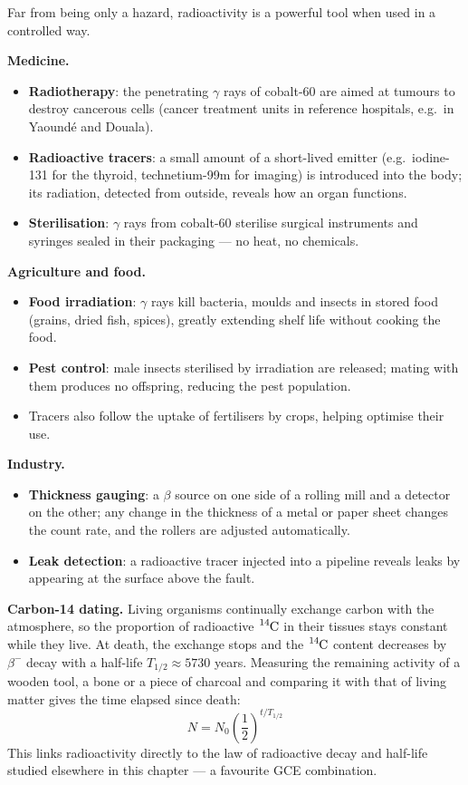 \documentclass[11pt]{article}
\newcounter{popsec}
\newcounter{popsub}
\newcommand{\courssub}[1]{%
  \stepcounter{popsub}%
  \par\vspace{9pt}\noindent{\popxbold\fontsize{11.5}{13}\selectfont\color{popink}{\color{poporange}\thepopsec.\thepopsub}\hspace{6pt}#1}\par\nopagebreak\vspace{4pt}
}
\begin{document}
\courssub{Applications of Radioactivity}

Far from being only a hazard, radioactivity is a powerful tool when used in a controlled way.

\textbf{Medicine.}
\begin{itemize}
\item \textbf{Radiotherapy}: the penetrating $\gamma$ rays of cobalt-60 are aimed at tumours to destroy cancerous cells (cancer treatment units in reference hospitals, e.g.\ in Yaoundé and Douala).
\item \textbf{Radioactive tracers}: a small amount of a short-lived emitter (e.g.\ iodine-131 for the thyroid, technetium-99m for imaging) is introduced into the body; its radiation, detected from outside, reveals how an organ functions.
\item \textbf{Sterilisation}: $\gamma$ rays from cobalt-60 sterilise surgical instruments and syringes sealed in their packaging — no heat, no chemicals.
\end{itemize}

\textbf{Agriculture and food.}
\begin{itemize}
\item \textbf{Food irradiation}: $\gamma$ rays kill bacteria, moulds and insects in stored food (grains, dried fish, spices), greatly extending shelf life without cooking the food.
\item \textbf{Pest control}: male insects sterilised by irradiation are released; mating with them produces no offspring, reducing the pest population.
\item Tracers also follow the uptake of fertilisers by crops, helping optimise their use.
\end{itemize}

\textbf{Industry.}
\begin{itemize}
\item \textbf{Thickness gauging}: a $\beta$ source on one side of a rolling mill and a detector on the other; any change in the thickness of a metal or paper sheet changes the count rate, and the rollers are adjusted automatically.
\item \textbf{Leak detection}: a radioactive tracer injected into a pipeline reveals leaks by appearing at the surface above the fault.
\end{itemize}

\textbf{Carbon-14 dating.} Living organisms continually exchange carbon with the atmosphere, so the proportion of radioactive $\ce{^{14}C}$ in their tissues stays constant while they live. At death, the exchange stops and the $\ce{^{14}C}$ content decreases by $\beta^-$ decay with a half-life $T_{1/2} \approx 5730$ years. Measuring the remaining activity of a wooden tool, a bone or a piece of charcoal and comparing it with that of living matter gives the time elapsed since death:
\[ N = N_0\left(\frac{1}{2}\right)^{t/T_{1/2}} \]
This links radioactivity directly to the law of radioactive decay and half-life studied elsewhere in this chapter — a favourite GCE combination.
\end{document}
